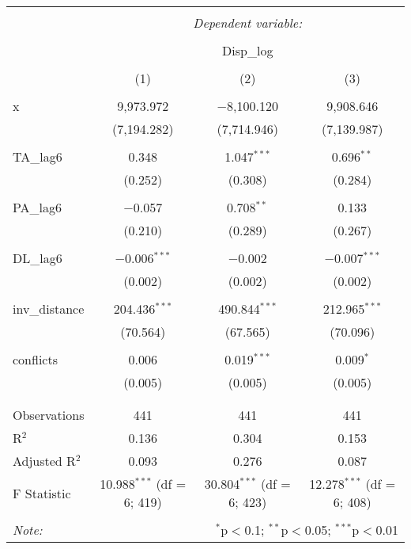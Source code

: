 
\begin{table}[!htbp] \centering 
  \caption{} 
  \label{} 
\begin{tabular}{@{\extracolsep{5pt}}lccc} 
\\[-1.8ex]\hline 
\hline \\[-1.8ex] 
 & \multicolumn{3}{c}{\textit{Dependent variable:}} \\ 
\cline{2-4} 
\\[-1.8ex] & \multicolumn{3}{c}{Disp\_log} \\ 
\\[-1.8ex] & (1) & (2) & (3)\\ 
\hline \\[-1.8ex] 
 x & 9,973.972 & $-$8,100.120 & 9,908.646 \\ 
  & (7,194.282) & (7,714.946) & (7,139.987) \\ 
  & & & \\ 
 TA\_lag6 & 0.348 & 1.047$^{***}$ & 0.696$^{**}$ \\ 
  & (0.252) & (0.308) & (0.284) \\ 
  & & & \\ 
 PA\_lag6 & $-$0.057 & 0.708$^{**}$ & 0.133 \\ 
  & (0.210) & (0.289) & (0.267) \\ 
  & & & \\ 
 DL\_lag6 & $-$0.006$^{***}$ & $-$0.002 & $-$0.007$^{***}$ \\ 
  & (0.002) & (0.002) & (0.002) \\ 
  & & & \\ 
 inv\_distance & 204.436$^{***}$ & 490.844$^{***}$ & 212.965$^{***}$ \\ 
  & (70.564) & (67.565) & (70.096) \\ 
  & & & \\ 
 conflicts & 0.006 & 0.019$^{***}$ & 0.009$^{*}$ \\ 
  & (0.005) & (0.005) & (0.005) \\ 
  & & & \\ 
\hline \\[-1.8ex] 
Observations & 441 & 441 & 441 \\ 
R$^{2}$ & 0.136 & 0.304 & 0.153 \\ 
Adjusted R$^{2}$ & 0.093 & 0.276 & 0.087 \\ 
F Statistic & 10.988$^{***}$ (df = 6; 419) & 30.804$^{***}$ (df = 6; 423) & 12.278$^{***}$ (df = 6; 408) \\ 
\hline 
\hline \\[-1.8ex] 
\textit{Note:}  & \multicolumn{3}{r}{$^{*}$p$<$0.1; $^{**}$p$<$0.05; $^{***}$p$<$0.01} \\ 
\end{tabular} 
\end{table} 
